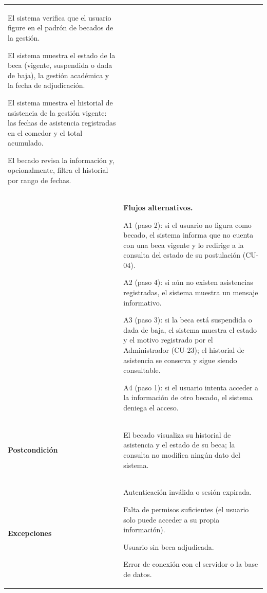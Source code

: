 \begin{longtable}{>{\raggedright\arraybackslash}p{2.9cm} >{\raggedright\arraybackslash}p{12.6cm}}
\begin{cupasos}
    \item El sistema verifica que el usuario figure en el padrón de becados de la gestión.
    \item El sistema muestra el estado de la beca (vigente, suspendida o dada de baja), la gestión académica y la fecha de adjudicación.
    \item El sistema muestra el historial de asistencia de la gestión vigente: las fechas de asistencia registradas en el comedor y el total acumulado.
    \item El becado revisa la información y, opcionalmente, filtra el historial por rango de fechas.
\end{cupasos} \\
 & \textbf{Flujos alternativos.}
\begin{cuvin}
    \item A1 (paso 2): si el usuario no figura como becado, el sistema informa que no cuenta con una beca vigente y lo redirige a la consulta del estado de su postulación (CU-04).
    \item A2 (paso 4): si aún no existen asistencias registradas, el sistema muestra un mensaje informativo.
    \item A3 (paso 3): si la beca está suspendida o dada de baja, el sistema muestra el estado y el motivo registrado por el Administrador (CU-23); el historial de asistencia se conserva y sigue siendo consultable.
    \item A4 (paso 1): si el usuario intenta acceder a la información de otro becado, el sistema deniega el acceso.
\end{cuvin} \\
\midrule
\textbf{Postcondición} & \vspace{-\baselineskip}\begin{cuvin}
    \item El becado visualiza su historial de asistencia y el estado de su beca; la consulta no modifica ningún dato del sistema.
\end{cuvin} \\
\midrule
\textbf{Excepciones} & \vspace{-\baselineskip}\begin{cuvin}
    \item Autenticación inválida o sesión expirada.
    \item Falta de permisos suficientes (el usuario solo puede acceder a su propia información).
    \item Usuario sin beca adjudicada.
    \item Error de conexión con el servidor o la base de datos.
\end{cuvin} \\
\end{longtable}
\endgroup
\addtocounter{table}{-1}

